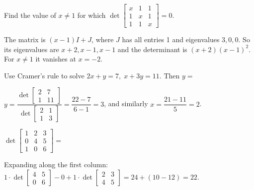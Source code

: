 \begin{question}[id=det-8, marks=2]
Find the value of $x \ne 1$ for which $\det \begin{bmatrix} x & 1 & 1 \\ 1 & x & 1 \\ 1 & 1 & x \end{bmatrix} = 0$.
\begin{solution}
The matrix is $(x - 1)I + J$, where $J$ has all entries 1 and eigenvalues $3, 0, 0$. So its eigenvalues are $x + 2, x - 1, x - 1$ and the determinant is $(x + 2)(x - 1)^2$. For $x \ne 1$ it vanishes at $x = -2$.
\end{solution}
\end{question}

\begin{question}[id=det-9]
Use Cramer's rule to solve $2x + y = 7,\; x + 3y = 11$. Then $y =$
\begin{solution}
$y = \dfrac{\det \begin{bmatrix} 2 & 7 \\ 1 & 11 \end{bmatrix}}{\det \begin{bmatrix} 2 & 1 \\ 1 & 3 \end{bmatrix}} = \dfrac{22 - 7}{6 - 1} = 3$, and similarly $x = \dfrac{21 - 11}{5} = 2$.
\end{solution}
\end{question}

\begin{question}[id=det-10]
$\det \begin{bmatrix} 1 & 2 & 3 \\ 0 & 4 & 5 \\ 1 & 0 & 6 \end{bmatrix} =$
\begin{solution}
Expanding along the first column: $1 \cdot \det\begin{bmatrix} 4 & 5 \\ 0 & 6 \end{bmatrix} - 0 + 1 \cdot \det\begin{bmatrix} 2 & 3 \\ 4 & 5 \end{bmatrix} = 24 + (10 - 12) = 22$.
\end{solution}
\end{question}

